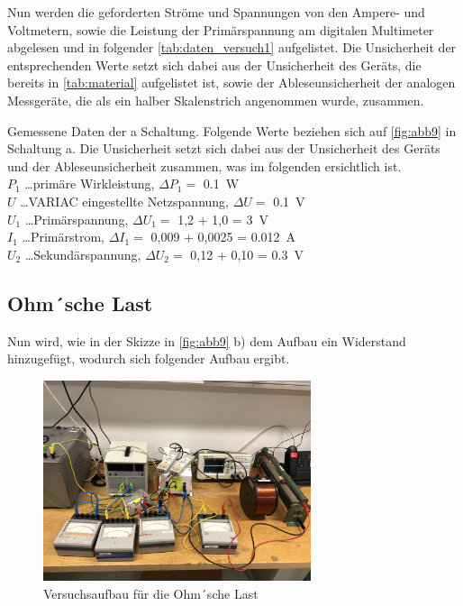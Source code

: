 \documentclass[11pt,ngerman]{scrartcl}
\begin{document}
Nun werden die geforderten Ströme und Spannungen von den Ampere- und
Voltmetern, sowie die Leistung der Primärspannung am digitalen Multimeter
abgelesen und in folgender \autoref{tab:daten_versuch1} aufgelistet. Die
Unsicherheit der entsprechenden Werte setzt sich dabei aus der Unsicherheit des
Geräts, die bereits in \autoref{tab:material} aufgelistet ist, sowie der
Ableseunsicherheit der analogen Messgeräte, die als ein halber Skalenstrich
angenommen wurde, zusammen.


\begin{table}[H]
	\caption{Gemessene Daten der a Schaltung. Folgende Werte beziehen sich auf \autoref{fig:abb9} in Schaltung a. Die Unsicherheit setzt sich dabei aus der Unsicherheit des Geräts und der Ableseunsicherheit zusammen, was im folgenden ersichtlich ist.\\
		$P_1$ \dots primäre Wirkleistung, $\Delta P_1 =$ \SI{0.1}{W} \\
		$U$ \dots VARIAC eingestellte Netzspannung, $\Delta U =$ \SI{0.1}{V}\\
		$U_1$ \dots  Primärspannung, $\Delta U_1 =$ 1,2 + 1,0 = \SI{3}{V} \\
		$I_1$ \dots Primärstrom, $\Delta I_1 =$ 0,009 + 0,0025 = \SI{0.012}{A} \\
		$U_2$ \dots Sekundärspannung, $\Delta U_2 =$ 0,12 + 0,10 = \SI{0.3}{V}  \\
	}
	\label{tab:daten_versuch1}
	\begin{center}
		
	\end{center}
\end{table}



\subsection{Ohm´sche Last}

Nun wird, wie in der Skizze in \autoref{fig:abb9} b) dem Aufbau ein Widerstand hinzugefügt, wodurch sich folgender Aufbau ergibt.

\begin{figure}[H]
	\begin{center}
		\includegraphics[width=0.7\textwidth]{widerstand}
	\end{center}
	\caption{Versuchsaufbau für die Ohm´sche Last}
	\label{fig:widerstand}
\end{figure}
\end{document}
